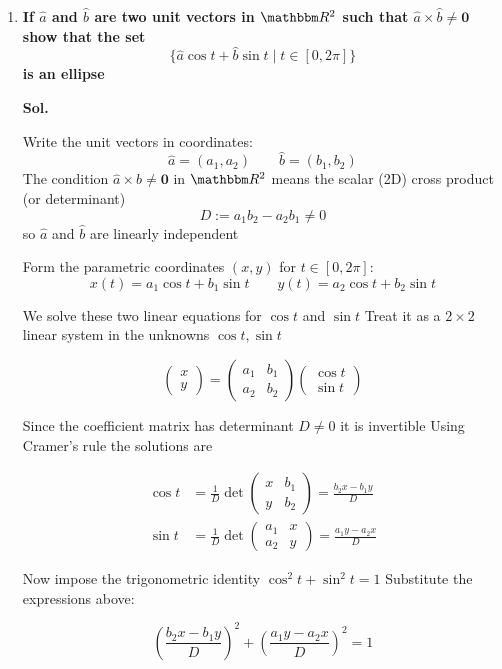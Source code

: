 \documentclass[14pt]{extarticle}
\newcommand{\bb}{\mathbbm}
\begin{document}
\begin{enumerate}
\newpage
\item \textbf{If $\hat a$ and $\hat b$ are two unit vectors in $\bb R^2$ such that $\hat a\times\hat b\neq\mathbf{0}$ show that the set}
\[
\{\hat a\cos t + \hat b\sin t \mid t\in[0,2\pi]\}
\]
\textbf{is an ellipse}

\textbf{Sol.}

Write the unit vectors in coordinates:
\[
\hat a = (a_1,a_2)\qquad \hat b=(b_1,b_2)
\]
The condition $\hat a\times\hat b\neq\mathbf{0}$ in $\bb R^2$ means the scalar (2D) cross product (or determinant)
\[
D := a_1 b_2 - a_2 b_1 \neq 0
\]
so $\hat a$ and $\hat b$ are linearly independent

Form the parametric coordinates $(x,y)$ for $t\in[0,2\pi]$:
\[
x(t) = a_1\cos t + b_1\sin t\qquad
y(t) = a_2\cos t + b_2\sin t
\]

We solve these two linear equations for $\cos t$ and $\sin t$ Treat it as a $2\times2$ linear system in the unknowns $\cos t,\sin t$

\[
\begin{pmatrix} x \\ y \end{pmatrix}
=
\begin{pmatrix} a_1 & b_1 \\ a_2 & b_2 \end{pmatrix}
\begin{pmatrix} \cos t \\ \sin t \end{pmatrix}
\]

Since the coefficient matrix has determinant $D\neq 0$ it is invertible Using Cramer's rule the solutions are

\begin{align*}
\cos t &= \frac{1}{D}\det\begin{pmatrix} x & b_1 \\ y & b_2 \end{pmatrix}
= \frac{b_2 x - b_1 y}{D}\\[6pt]
\sin t &= \frac{1}{D}\det\begin{pmatrix} a_1 & x \\ a_2 & y \end{pmatrix}
= \frac{a_1 y - a_2 x}{D}
\end{align*}

Now impose the trigonometric identity $\cos^2 t + \sin^2 t = 1$ Substitute the expressions above:

\[
\left(\frac{b_2 x - b_1 y}{D}\right)^2 + \left(\frac{a_1 y - a_2 x}{D}\right)^2 = 1
\]


\end{enumerate}
\end{document}
